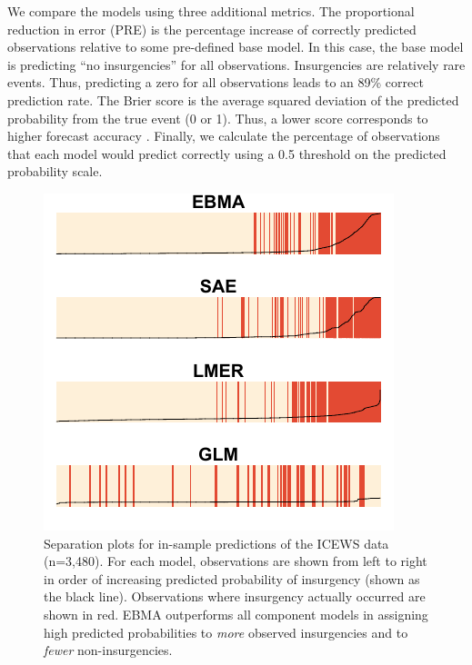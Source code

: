 We compare the models using three additional metrics.  The
proportional reduction in error (PRE) is the percentage increase of
correctly predicted observations relative to some pre-defined base
model. In this case, the base model is predicting ``no insurgencies''
for all observations.  Insurgencies are relatively rare events.  Thus,
predicting a zero for all observations leads to an 89\% correct
prediction rate. The Brier score is the average squared deviation of
the predicted probability from the true event (0 or 1).  Thus, a lower
score corresponds to higher forecast accuracy \citep{Brier:1950}.
Finally, we calculate the percentage of observations that each model
would predict correctly using a 0.5 threshold on the predicted
probability scale.
\begin{figure}
  \caption{\footnotesize Separation plots for in-sample predictions of
    the ICEWS data (n=3,480).  For each model, observations are shown
    from left to right in order of increasing predicted probability of
    insurgency (shown as the black line).  Observations where
    insurgency actually occurred are shown in red. EBMA outperforms
    all component models in assigning high predicted probabilities to
    \textit{more} observed insurgencies and to \textit{fewer}
    non-insurgencies.}
\label{InSam1sep}
\begin{center}
\includegraphics[]{Insamplenew.pdf}
\end{center}
\end{figure}

